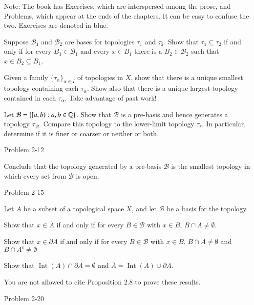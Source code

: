 \documentclass[minion]{homework651}
\def\calB{\mathcal{B}}
\DeclareMathOperator{\Int}{\mathrm{Int}}
\begin{document}
Note: The book has Exercises, which are interspersed among the
prose, and Problems, which appear at the ends of the chapters.
It can be easy to confuse the two.  Exercises are denoted in blue.

\begin{problems}

\problem Suppose $\calB_1$ and $\calB_2$ are bases for topologies $\tau_1$
and $\tau_2$.  Show that $\tau_1\subseteq \tau_2$ if and only if
for every $B_1\in \calB_1$ and every $x\in B_1$ there is a $B_2\in \calB_2$
such that $x\in B_2\subseteq B_1$.

\problem Given a family $\{\tau_\alpha\}_{\alpha\in I}$ of topologies in $X$,
show that there is a unique smallest topology containing each $\tau_\alpha$.
Show also that there is a unique largest topology contained in each $\tau_\alpha$.
Take advantage of past work!

\problem Let $\calB=\{[a,b):a,b\in \Rats\}$.  Show that $\calB$ 
is a pre-basis
and hence generates a topology $\tau_\calB$.  Compare this topology to the 
lower-limit topology $\tau_\ell$.  In particular, determine if it is finer or coarser
or neither or both.

\problem  Problem 2-12

Conclude that the topology generated by a pre-basis $\mathcal B$
is the smallest topology in which every set from $\mathcal B$ is open.

\problem  Problem 2-15

\problem  Let $A$ be a subset of a topological space $X$, and let $\calB$ be
a basis for the topology.
\begin{subproblems}
\item Show that $x\in\overline{A}$ if and only if for every $B\in\calB$ with $x\in B$, $B\cap A\neq\emptyset$.
\item Show that $x\in\partial A$ if and only if for every $B\in\calB$  with $x\in B$, $B\cap A\neq\emptyset$
and $B\cap A^c\neq \emptyset$
\item Show that $\Int(A)\cap\partial A = \emptyset$ and $\overline{A}=\Int(A)\cup \partial A$.
\end{subproblems}
You are not allowed to cite Proposition 2.8 to prove these results.

\problem Problem 2-20

\end{problems}
\end{document}
